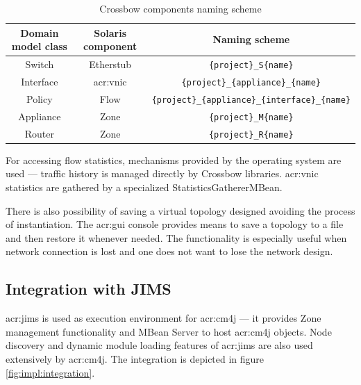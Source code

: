 \documentclass[11pt,openany]{book}
\begin{document}
        \begin{table}[H]
          \centering

          \begin{tabular}{|c|c|c|}
            \hline
            Domain model class & Solaris component & Naming scheme                                                \\
            \hline \hline
            Switch             & Etherstub         & \texttt{\{project\}\_S\{name\}}                              \\
            \hline
            Interface          & \gls{acr:vnic}    & \texttt{\{project\}\_\{appliance\}\_\{name\}}                \\
            \hline
            Policy             & Flow              & \texttt{\{project\}\_\{appliance\}\_\{interface\}\_\{name\}} \\
            \hline
            Appliance          & Zone              & \texttt{\{project\}\_M\{name\}}                              \\
            \hline
            Router             & Zone              & \texttt{\{project\}\_R\{name\}}                              \\
            \hline
          \end{tabular}

          \caption{Crossbow components naming scheme}
          \label{tab:impl:naming}
        \end{table}

        For accessing flow statistics, mechanisms provided by the operating system are used --- traffic history is
        managed directly by Crossbow libraries. \gls{acr:vnic} statistics are gathered by a specialized
        StatisticsGathererMBean.

        There is also possibility of saving a virtual topology designed avoiding the process of instantiation. The
        \gls{acr:gui} console provides means to save a topology to a file and then restore it whenever needed. The
        functionality is especially useful when network connection is lost and one does not want to lose the network
        design.


      \subsection{Integration with JIMS}

        \gls{acr:jims} is used as execution environment for \gls{acr:cm4j} --- it provides Zone management functionality
        and MBean Server to host \gls{acr:cm4j} objects. Node discovery and dynamic module loading features of
        \gls{acr:jims} are also used extensively by \gls{acr:cm4j}. The integration is depicted in figure
        \ref{fig:impl:integration}.
\end{document}
